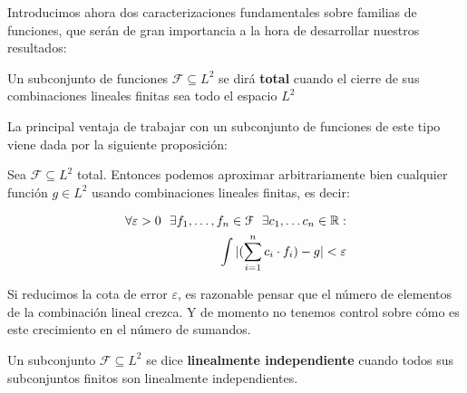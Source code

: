 Introducimos ahora dos caracterizaciones fundamentales sobre familias de funciones, que serán de gran importancia a la hora de desarrollar nuestros resultados:

\begin{definicion}
    Un subconjunto de funciones $\mathcal{F} \subseteq L^2$ se dirá \textbf{total} cuando el cierre de sus combinaciones lineales finitas sea todo el espacio $L^2$
\end{definicion}

La principal ventaja de trabajar con un subconjunto de funciones de este tipo viene dada por la siguiente proposición:

\begin{proposicion} \label{prop:conjuntos_totales_epsilon_aproximacion}
    Sea $\mathcal{F} \subseteq L^2$ total. Entonces podemos aproximar arbitrariamente bien cualquier función $g \in L^2$ usando combinaciones lineales finitas, es decir:

    \begin{equation} \label{eq:conjuntos_totales_epsilon_aproximacion}
    \begin{split}
        \forall \varepsilon > 0 \ \  \exists f_1, \ldots, f_n \in \mathcal{F} \ \  \exists c_1, \ldots c_n \in \mathbb{R}:\\
        \int | (\sum_{i = 1}^n c_i \cdot f_i) - g| < \varepsilon \\
    \end{split}
    \end{equation}

\end{proposicion}

\begin{observacion}
    Si reducimos la cota de error $\varepsilon$, es razonable pensar que el número de elementos de la combinación lineal crezca. Y de momento no tenemos control sobre cómo es este crecimiento en el número de sumandos.
\end{observacion}

\begin{definicion}

    Un subconjunto $\mathcal{F} \subseteq L^2$ se dice \textbf{linealmente independiente} cuando todos sus subconjuntos finitos son linealmente independientes.

\end{definicion}

